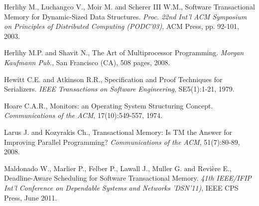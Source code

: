 \begin{thebibliography}{99}
{%
Herlihy M.,  Luchangco V.,  Moir M. and  Scherer III W.M., 
 Software Transactional Memory for Dynamic-Sized Data Structures. 
{\it  Proc. 22nd  Int'l  ACM Symposium on Principles of  Distributed 
Computing (PODC'03)},  ACM Press, pp. 92-101,  2003. 

% 
% 




Herlihy M.P.  and Shavit N.,
The Art of Multiprocessor Programming. 
{\it Morgan Kaufmann Pub.}, San Francisco (CA), 508 pages, 2008. 

 


Hewitt C.E. and Atkinson R.R., 
Specification and Proof Techniques for Serializers. 
{\it IEEE Transactions on Software Engineering}, SE5(1):1-21, 1979. 



Hoare C.A.R., 
Monitors: an Operating System Structuring Concept. 
{\it Communications of the  ACM}, 17(10):549-557, 1974. 


Larus J. and Kozyrakis Ch., 
Transactional Memory: Is TM the Answer for Improving Parallel Programming?
{\it Communications of the ACM}, 51(7):80-89, 2008. 



Maldonado W.,  Marlier P., Felber P.,  Lawall J., Muller G. and Revi\`ere E., 
Deadline-Aware Scheduling for Software Transactional Memory. 
{\it 41th  IEEE/IFIP Int'l  Conference on  Dependable  Systems and Networks
'DSN'11)}, IEEE CPS Press, June 2011. 




}
\end{thebibliography}
